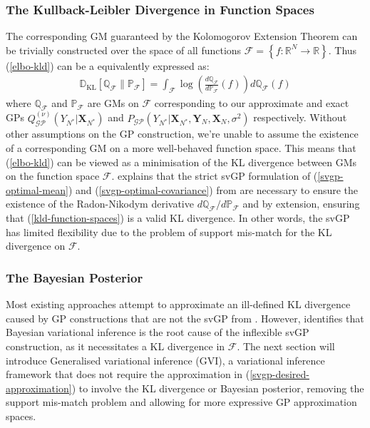 \documentclass{article}
\newcommand{\KLD}{\operatorname{\mathbb{D}_{KL}}}
\newcommand{\GP}{\operatorname{\mathcal{GP}}}
\numberwithin{equation}{section}
\begin{document}
\subsubsection{The Kullback-Leibler Divergence in Function Spaces}
The corresponding GM guaranteed by the Kolomogorov Extension Theorem can be trivially constructed over the space of all functions $\mathcal{F} = \left\{f: \mathbb{R}^{N} \rightarrow \mathbb{R} \right\}$. Thus (\ref{elbo-kld}) can be a equivalently expressed as:
\begin{align}
    \KLD\left[ \mathbb{Q}_\mathcal{F} \| \mathbb{P}_\mathcal{F} \right] = \int_{\mathcal{F}} \log \left( \frac{d \mathbb{Q}_\mathcal{F}}{d \mathbb{P}_\mathcal{F}} (f)\right)d \mathbb{Q}_\mathcal{F}(f)
    \label{kld-function-spaces}
\end{align}
where $\mathbb{Q}_\mathcal{F}$ and $\mathbb{P}_\mathcal{F}$ are GMs on $\mathcal{F}$ corresponding to our approximate and exact GPs $Q_{\GP}^{(\nu)}\left(Y_{N^*} \vert \mathbf{X}_{N^*}\right) $ and $P_{\GP}\left(Y_{N^*} \vert \mathbf{X}_{N^*}, \mathbf{Y}_N, \mathbf{X}_N, \sigma^2 \right)$ respectively. Without other assumptions on the GP construction, we're unable to assume the existence of a corresponding GM on a more well-behaved function space. This means that (\ref{elbo-kld}) can be viewed as a minimisation of the KL divergence between GMs on the function space $\mathcal{F}$. \cite{matthews2016sparse} explains that the strict svGP formulation of (\ref{svgp-optimal-mean}) and (\ref{svgp-optimal-covariance}) from \cite{titsias2009variational} are necessary to ensure the existence of the Radon-Nikodym derivative $d \mathbb{Q}_\mathcal{F}/d \mathbb{P}_\mathcal{F}$ and by extension, ensuring that (\ref{kld-function-spaces}) is a valid KL divergence. In other words, the svGP has limited flexibility due to the problem of support mis-match for the KL divergence on $\mathcal{F}$.

\subsubsection{The Bayesian Posterior}
Most existing approaches attempt to approximate an ill-defined KL divergence caused by GP constructions that are not the svGP from \cite{titsias2009variational}. However, \cite{wild2022generalized} identifies that Bayesian variational inference is the root cause of the inflexible svGP construction, as it necessitates a KL divergence in $\mathcal{F}$. The next section will introduce Generalised variational inference (GVI), a variational inference framework that does not require the approximation in (\ref{svgp-desired-approximation}) to involve the KL divergence or Bayesian posterior, removing the support mis-match problem and allowing for more expressive GP approximation spaces.
\end{document}
